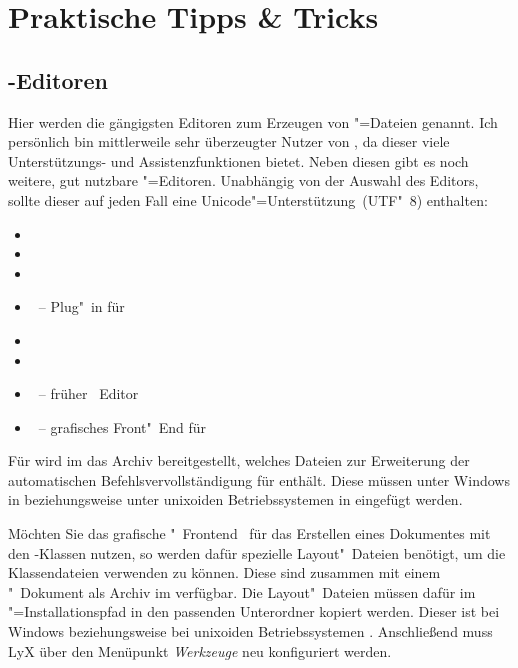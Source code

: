 \chapter{%
  Praktische Tipps \& Tricks%
  \label{sec:tips}%
}
\section{%
  -Editoren%
  \label{sec:tips:editor}%
}

Hier werden die gängigsten Editoren zum Erzeugen von "=Dateien 
genannt. Ich persönlich bin mittlerweile sehr überzeugter Nutzer von 
, da dieser viele Unterstützungs- und 
Assistenzfunktionen bietet. Neben diesen gibt es noch weitere, gut nutzbare 
"=Editoren. Unabhängig von der Auswahl des Editors, sollte dieser 
auf jeden Fall eine Unicode"=Unterstützung~(UTF"~8) enthalten:
%
\begin{itemize}
\item {}
\item {}
\item {}
\item {}~-- Plug"~in für 
\item {}
\item {}
\item {}~-- früher ~Editor
\item {}~-- grafisches Front"~End für 
\end{itemize}
%
Für  wird im \GitHubRepo* das Archiv 
bereitgestellt, welches Dateien zur Erweiterung der automatischen 
Befehlsvervollständigung für \TUDScript enthält. Diese müssen unter Windows in 
 beziehungsweise unter unixoiden 
Betriebssystemen in  eingefügt werden.

Möchten Sie das grafische "~Frontend~ 
für das Erstellen eines Dokumentes mit den \TUDScript-Klassen nutzen, so werden 
dafür spezielle Layout"~Dateien benötigt, um die Klassendateien verwenden zu 
können. Diese sind zusammen mit einem "~Dokument als 
Archiv 
im \GitHubRepo* verfügbar. Die Layout"~Dateien müssen dafür im 
"=Installationspfad in den passenden Unterordner 
kopiert werden. Dieser ist bei Windows
beziehungsweise bei unixoiden Betriebssystemen .
Anschließend muss LyX über den Menüpunkt \emph{Werkzeuge} neu konfiguriert 
werden. 



